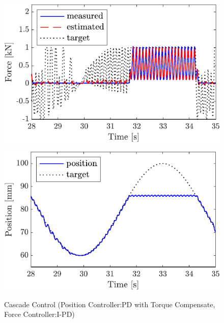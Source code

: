 \begin{figure}[t]
    \begin{minipage}{\minipageratio\hsize}
    \centering
        \includegraphics[keepaspectratio, scale = \minifigscale]{contents/IntegrationControl/figure/SECASQ/crop-FBcsqtch_IPD_trq_force.pdf}
        \label{fig5:crop-FBcsqtch_IPD_trq_force}
    \end{minipage}
    \begin{minipage}{\minipageratio\hsize}
    \centering
        \includegraphics[keepaspectratio, scale = \minifigscale]{contents/IntegrationControl/figure/SECASQ/crop-FBcsqtch_IPD_trq_pos.pdf}
        \label{fig5:crop-FBcsqtch_IPD_trq_pos}
    \end{minipage}
    \caption{Cascade Control (Position Controller:PD with Torque Compensate, Force Controller:I-PD)}  
    \label{fig5:crop-FBcsqtch_IPD_trq}
\end{figure}

